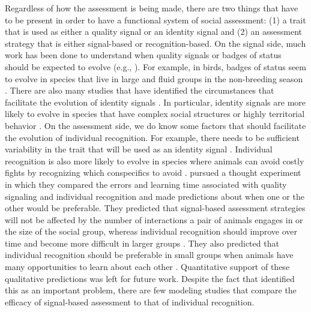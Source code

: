 Regardless of how the assessment is being made, there are two things that have to be present in order to have a functional system of social assessment: (1) a trait that is used as either a quality signal or an identity signal and (2) an assessment strategy that is either signal-based or recognition-based.  On the signal side, much work has been done to understand when quality signals or badges of status should be expected to evolve (e.g., \citep{Whitfield:1987tg,Rohwer:1975fk,Rohwer:1982fk,Dawkins:1991ly,Johnstone:1995vn,Lachmann:1998fk,Tibbetts:2009kx}). For example, in birds, badges of status seem to evolve in species that live in large and fluid groups in the non-breeding season \citep{Tibbetts:2009kx}. There are also many studies that have identified the circumstances that facilitate the evolution of identity signals \citep{Rohwer:1975fk,Whitfield:1987tg,Sheehan:2009we,Pollard:2011te,Sheehan:2014fk}. In particular, identity signals are more likely to evolve in species that have complex social structures or highly territorial behavior \citep{Tibbetts2007IndividualDifferent}. On the assessment side, we do know some factors that should facilitate the evolution of individual recognition. For example, there needs to be sufficient variability in the trait that will be used as an identity signal \citep{Sheehan:2014fk}. Individual recognition is also more likely to evolve in species where animals can avoid costly fights by recognizing which conspecifics to avoid \citep{DEttorre:2005nu}.  \citet{sheehan2016evotradeoff} pursued a thought experiment in which they compared the errors and learning time associated with quality signaling and individual recognition and made predictions about when one or the other would be preferable. They predicted that signal-based assessment strategies will not be affected by the number of interactions a pair of animals engages in or the size of the social group, whereas individual recognition should improve over time and become more difficult in larger groups \citep{sheehan2016evotradeoff}. They also predicted that individual recognition should be preferable in small groups when animals have many opportunities to learn about each other \citep{sheehan2016evotradeoff}. Quantitative support of these qualitative predictions was left for future work. Despite the fact that \citet{sheehan2016evotradeoff} identified this as an important problem, there are few modeling studies that compare the efficacy of signal-based assessment to that of individual recognition. 

